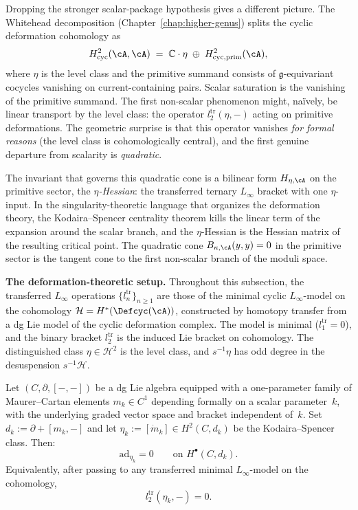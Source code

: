 Dropping the stronger scalar-package hypothesis gives a different
picture. The Whitehead decomposition
(Chapter~\ref{chap:higher-genus}) splits the cyclic deformation
cohomology as
\[
H^2_{\mathrm{cyc}}(\cA,\cA)
\;=\;
\mathbb{C}\cdot\eta
\;\oplus\;
H^2_{\mathrm{cyc,prim}}(\cA),
\]
where $\eta$ is the level class and the primitive summand consists of
$\mathfrak{g}$-equivariant cocycles vanishing on current-containing
pairs. Scalar saturation is the vanishing of the primitive summand.
The first non-scalar phenomenon might, na\"ively, be linear transport
by the level class: the operator $l_2^{\mathrm{tr}}(\eta,-)$ acting on
primitive deformations. The geometric surprise is that this operator
vanishes \emph{for formal reasons} (the level class is
cohomologically central), and the first genuine departure from
scalarity is \emph{quadratic}.

The invariant that governs this quadratic cone is a bilinear form
$H_{\eta,\cA}$ on the primitive sector, the \emph{$\eta$-Hessian}:
the transferred ternary $L_\infty$ bracket with one $\eta$-input. In
the singularity-theoretic language that organizes the deformation
theory, the Kodaira--Spencer centrality theorem kills the linear term
of the expansion around the scalar branch, and the $\eta$-Hessian is
the Hessian matrix of the resulting critical point. The quadratic cone
$B_{\kappa,\cA}(y,y) = 0$ in the primitive sector is the tangent cone
to the first non-scalar branch of the moduli space.

\medskip

\noindent\textbf{The deformation-theoretic setup.}\enspace
Throughout this subsection, the transferred $L_\infty$ operations
$\{l_n^{\mathrm{tr}}\}_{n \geq 1}$ are those of the minimal cyclic
$L_\infty$-model on the cohomology
$\mathcal{H} = H^*(\Defcyc(\cA))$, constructed by homotopy transfer
from a dg Lie model of the cyclic deformation complex. The model is
minimal ($l_1^{\mathrm{tr}} = 0$), and the binary bracket
$l_2^{\mathrm{tr}}$ is the induced Lie bracket on cohomology. The
distinguished class $\eta \in \mathcal{H}^2$ is the level class, and
$s^{-1}\eta$ has odd degree in the desuspension $s^{-1}\mathcal{H}$.

\begin{theorem}
\label{thm:ks-centrality}
Let $(C, \partial, [-,-])$ be a dg Lie algebra equipped with a
one-parameter family of Maurer--Cartan elements
$m_k \in C^1$ depending formally on a scalar parameter~$k$, with the
underlying graded vector space and bracket independent of~$k$. Set
$d_k := \partial + [m_k, -]$ and let
$\eta_k := [\dot{m}_k] \in H^2(C, d_k)$ be the Kodaira--Spencer
class. Then:
\[
\mathrm{ad}_{\eta_k} = 0
\qquad\text{on } H^\bullet(C, d_k).
\]
Equivalently, after passing to any transferred minimal
$L_\infty$-model on the cohomology,
\[
l_2^{\mathrm{tr}}(\eta_k, -) = 0.
\]
\end{theorem}

